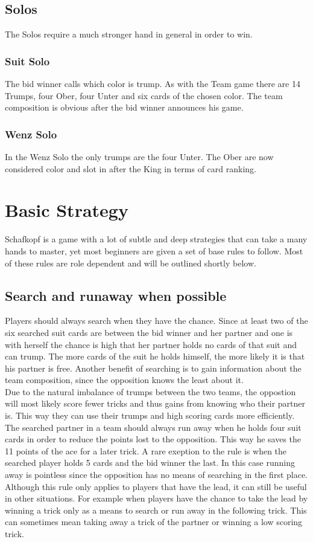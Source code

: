 \subsection{Solos}
The Solos require a much stronger hand in general in order to win.

\subsubsection{Suit Solo}
The bid winner calls which color is trump.
As with the Team game there are 14 Trumps, four Ober, four Unter and six cards of the chosen color.
The team composition is obvious after the bid winner announces his game.

\subsubsection{Wenz Solo}
In the Wenz Solo the only trumps are the four Unter.
The Ober are now considered color and slot in after the King in terms of card ranking.


\section{Basic Strategy}
Schafkopf is a game with a lot of subtle and deep strategies that can take a many hands to master, yet most beginners
are given a set of base rules to follow.
Most of these rules are role dependent and will be outlined shortly below.

\subsection{Search and runaway when possible}
Players should always search when they have the chance.
Since at least two of the six searched suit cards are between the bid winner and her partner and one is with herself
the chance is high that her partner holds no cards of that suit and can trump.
The more cards of the suit he holds himself, the more likely it is that his partner is free.
Another benefit of searching is to gain information about the team composition, since the opposition knows the least
about it.\\
Due to the natural imbalance of trumps between the two teams, the oppostion will most likely score fewer tricks and
thus gains from knowing who their partner is.
This way they can use their trumps and high scoring cards more efficiently.
\newline
The searched partner in a team should always run away when he holds four suit cards in order to reduce the points lost
to the opposition.
This way he saves the 11 points of the ace for a later trick.
A rare exeption to the rule is when the searched player holds 5 cards and the bid winner the last.
In this case running away is pointless since the opposition has no means of searching in the first place.
\newline
Although this rule only applies to players that have the lead, it can still be useful in other situations.
For example when players have the chance to take the lead by winning a trick only as a means to search or run away in
the following trick.
This can sometimes mean taking away a trick of the partner or winning a low scoring trick.

